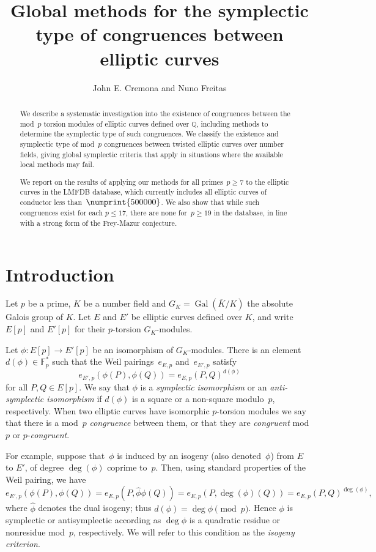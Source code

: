 \documentclass[twoside,leqno,symbols-for-thanks, draft]{rmi}
\title[Congruences between elliptic curves]{Global methods for the symplectic type of congruences between elliptic curves}
\author[J. E. Cremona and N. Freitas]{John E. Cremona and Nuno Freitas}
\numberwithin{equation}{section}
\newcommand{\Fpstar}{\mathbb{F}_p^*}
\newcommand{\Q}{\mathbb{Q}}
\newcommand{\Kbar}{{\overline{K}}}
\DeclareMathOperator{\Gal}{Gal}
\theoremstyle{remark}
\begin{document}

\begin{abstract}
We describe a systematic investigation into the existence of
congruences between the mod~$p$ torsion modules of elliptic curves
defined over $\Q$, including methods to determine the symplectic type
of such congruences. We classify the existence and symplectic type of
mod~$p$ congruences between twisted elliptic curves over number
fields, giving global symplectic criteria that apply in situations
where the available local methods may fail.

We report on the results of applying our methods for all
primes~$p\ge7$ to the elliptic curves in the LMFDB database, which
currently includes all elliptic curves of conductor less
than~$\numprint{500000}$.  We also show that while such congruences
exist for each $p\le17$, there are none for~$p \geq 19$ in the
database, in line with a strong form of the Frey-Mazur conjecture.
\end{abstract}


\section{Introduction}

Let $p$ be a prime, $K$ be a number field and $G_K = \Gal(\Kbar/K)$
the absolute Galois group of $K$.  Let $E$ and $E'$ be elliptic curves
defined over $K$, and write $E[p]$ and $E'[p]$ for their $p$-torsion
$G_K$-modules.

Let $\phi : E[p] \to E'[p]$ be an isomorphism of $G_K$-modules.  There
is an element $d(\phi) \in \Fpstar$ such that the Weil
pairings~$e_{E,p}$ and~$e_{E',p}$ satisfy
\[
e_{E',p}(\phi(P), \phi(Q)) = e_{E,p}(P, Q)^{d(\phi)}
\]
for all $P, Q \in E[p]$.  We say that $\phi$ is a {\em symplectic
  isomorphism} or an {\em anti-symplectic isomorphism} if $d(\phi)$ is
a square or a non-square modulo~$p$, respectively.  When two elliptic
curves have isomorphic $p$-torsion modules we say that there is a
mod~$p$ {\em congruence} between them, or that they are {\em
  congruent} mod~$p$ or $p$-{\em congruent}.

For example, suppose that~$\phi$ is induced by an isogeny (also
denoted~$\phi$) from $E$ to $E'$, of degree $\deg(\phi)$ coprime
to~$p$. Then, using standard properties of the Weil pairing,
we have
\[
  e_{E',p}(\phi(P), \phi(Q)) = e_{E,p}(P, \hat\phi\phi(Q)) =
  e_{E,p}(P, \deg(\phi)(Q)) = e_{E,p}(P, Q)^{\deg(\phi)},
  \]
  where $\hat{\phi}$ denotes the dual isogeny; 
  thus $d(\phi)=\deg\phi\pmod{p}$.
  Hence $\phi$ is symplectic or antisymplectic according as $\deg\phi$
is a quadratic residue or nonresidue mod~$p$, respectively.  We will refer to
this condition as the \emph{isogeny criterion}.
\end{document}
